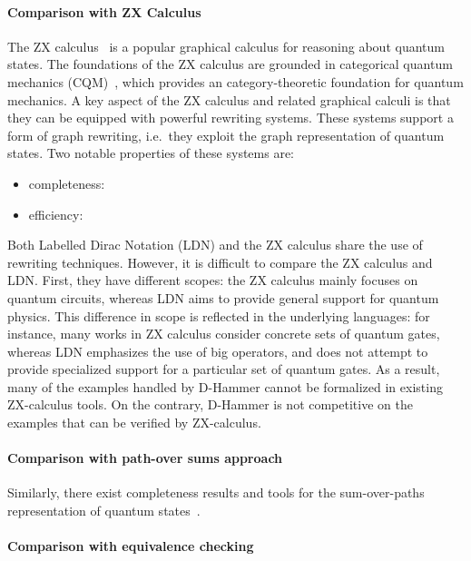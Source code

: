 \paragraph*{Comparison with ZX Calculus}
The ZX calculus~\cite{DBLP:conf/icalp/CoeckeD08,vandewetering2020zx}
is a popular graphical calculus for reasoning about quantum states.
The foundations of the ZX calculus are grounded in categorical quantum
mechanics (CQM)~\cite{DBLP:conf/lics/AbramskyC04}, which provides an
category-theoretic foundation for quantum mechanics.  A key aspect of
the ZX calculus and related graphical calculi is that they can be
equipped with powerful rewriting systems. These systems support a form
of graph rewriting, i.e.\, they exploit the graph representation of
quantum states. Two notable properties of these systems are:
\begin{itemize}
\item completeness:
\item efficiency:
\end{itemize}
Both Labelled Dirac Notation (LDN) and the ZX calculus share the use
of rewriting techniques. However, it is difficult to compare the ZX
calculus and LDN. First, they have different scopes: the ZX calculus
mainly focuses on quantum circuits, whereas LDN aims to provide
general support for quantum physics. This difference in scope is
reflected in the underlying languages: for instance, many works in ZX
calculus consider concrete sets of quantum gates, whereas LDN
emphasizes the use of big operators, and does not attempt to provide
specialized support for a particular set of quantum gates. As a
result, many of the examples handled by D-Hammer cannot be formalized
in existing ZX-calculus tools. On the contrary, D-Hammer is not
competitive on the examples that can be verified by ZX-calculus.


\paragraph*{Comparison with path-over sums approach}
Similarly, there exist
completeness results and tools for the sum-over-paths representation
of quantum states~\cite{amy2018towards,amy2023complete}.


\paragraph*{Comparison with equivalence checking}

